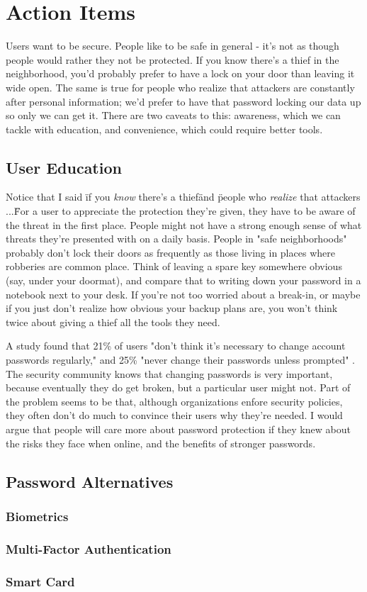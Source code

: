 \documentclass[12pt]{apa6}
\begin{document}
\section{Action Items}
Users want to be secure. People like to be safe in general - it's not as though people would rather they not be protected. If you know there's a thief in the neighborhood, you'd probably prefer to have a lock on your door than leaving it wide open. The same is true for people who realize that attackers are constantly after personal information; we'd prefer to have that password locking our data up so only we can get it. There are two caveats to this: awareness, which we can tackle with education, and convenience, which could require better tools.

\subsection{User Education}

Notice that I said \"if you \emph{know} there's a thief\" and \"people who \emph{realize} that attackers ...\" For a user to appreciate the protection they're given, they have to be aware of the threat in the first place. People might not have a strong enough sense of what threats they're presented with on a daily basis. People in "safe neighborhoods" probably don't lock their doors as frequently as those living in places where robberies are common place. Think of leaving a spare key somewhere obvious (say, under your doormat), and compare that to writing down your password in a notebook next to your desk. If you're not too worried about a break-in, or maybe if you just don't realize how obvious your backup plans are, you won't think twice about giving a thief all the tools they need.

A study found that 21\% of users "don't think it's necessary to change account passwords regularly," and 25\% "never change their passwords unless prompted" \parencite{mcafee11}. The security community knows that changing passwords is very important, because eventually they do get broken, but a particular user might not. Part of the problem seems to be that, although organizations enfore security policies, they often don't do much to convince their users why they're needed. I would argue that people will care more about password protection if they knew about the risks they face when online, and the benefits of stronger passwords.


\subsection{Password Alternatives}

\subsubsection{Biometrics}

\subsubsection{Multi-Factor Authentication}

\subsubsection{Smart Card}






\printbibliography
\end{document}

